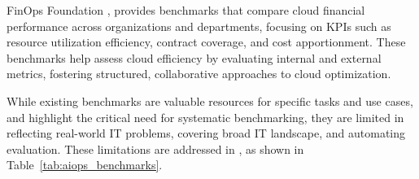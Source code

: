 FinOps Foundation \cite{finopsbench}, provides benchmarks that compare cloud financial performance across organizations and departments, focusing on KPIs such as resource utilization efficiency, contract coverage, and cost apportionment. These benchmarks help assess cloud efficiency by evaluating internal and external metrics, fostering structured, collaborative approaches to cloud optimization. 

While existing benchmarks are valuable resources for specific tasks and use cases, and highlight the critical need for systematic benchmarking,  they are limited in reflecting real-world IT problems, covering broad IT landscape, and automating evaluation. These limitations are addressed in \bench, as shown in Table~\ref{tab:aiops_benchmarks}.











